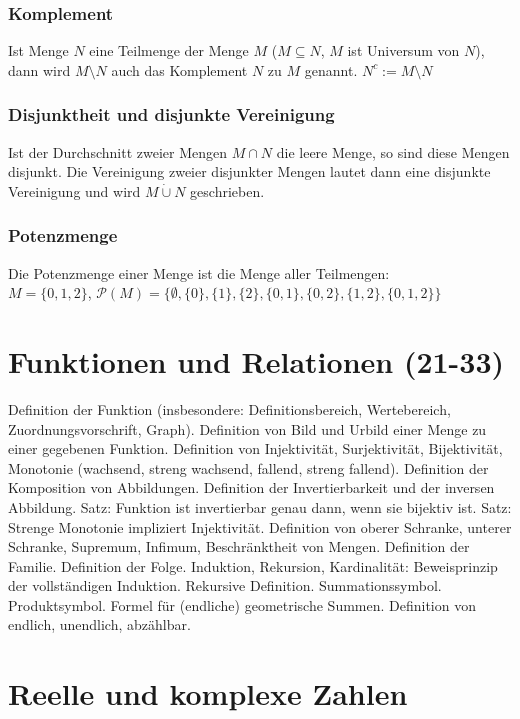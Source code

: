\documentclass[10pt,a4paper]{article}
\begin{document}
\subsubsection{Komplement}
Ist Menge $N$ eine Teilmenge der Menge $M$ ($M \subseteq N$, $M$ ist Universum von $N$), dann wird $M \setminus N$ auch das Komplement $N$ zu $M$ genannt. $N^c := M \setminus N$

\subsubsection{Disjunktheit und disjunkte Vereinigung}
Ist der Durchschnitt zweier Mengen $M \cap N$ die leere Menge, so sind diese Mengen disjunkt. Die Vereinigung zweier disjunkter Mengen lautet dann eine disjunkte Vereinigung und wird $M \dot{\cup} N$ geschrieben.

\subsubsection{Potenzmenge}
Die Potenzmenge einer Menge ist die Menge aller Teilmengen:\\
$M = \{0,1,2\}$, $\mathcal{P}(M)= \{\emptyset, \{0\}, \{1\}, \{2\}, \{0,1\}, \{0,2\}, \{1,2\}, \{0,1,2\}\}$


\section{Funktionen und Relationen (21-33)}
  
Definition der Funktion (insbesondere: Definitionsbereich, Wertebereich, Zuordnungsvorschrift, Graph). Definition von Bild und Urbild einer Menge zu einer gegebenen Funktion. Definition von Injektivität, Surjektivität, Bijektivität, Monotonie (wachsend, streng wachsend, fallend, streng fallend). Definition der Komposition von Abbildungen. Definition der Invertierbarkeit und der inversen Abbildung. Satz: Funktion ist invertierbar genau dann, wenn sie bijektiv ist. Satz: Strenge Monotonie impliziert Injektivität. Definition von oberer Schranke, unterer Schranke, Supremum, Infimum, Beschränktheit von Mengen. Definition der Familie. Definition der Folge. 
Induktion, Rekursion, Kardinalität: 
Beweisprinzip der vollständigen Induktion. Rekursive Definition. Summationssymbol. Produktsymbol. Formel für (endliche) geometrische Summen. Definition von endlich, unendlich, abzählbar. 

\section{Reelle und komplexe Zahlen}
 
\end{document}
